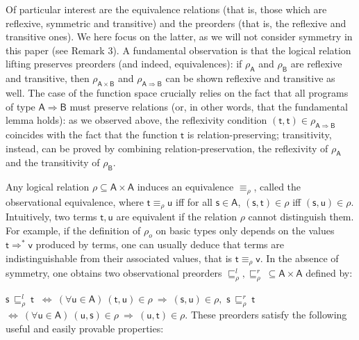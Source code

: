 Of particular interest are the equivalence relations (that is, those which are reflexive, symmetric and transitive) and the preorders (that is, the reflexive and transitive ones). We here focus on the latter, as we will not consider symmetry in this paper (see Remark 3). A fundamental observation is that the logical relation lifting preserves preorders (and indeed, equivalences): if $\rho_{\mathsf{A}}$ and $\rho_{\mathsf{B}}$ are reflexive and transitive, then $\rho_{\mathsf{A}\times\mathsf{B}}$ and $\rho_{\mathsf{A}\Rightarrow\mathsf{B}}$ can be shown reflexive and transitive as well. The case of the function space crucially relies on the fact that all programs of type $\mathsf{A}\Rightarrow\mathsf{B}$ must preserve relations (or, in other words, that the fundamental lemma holds): as we observed above, the reflexivity condition $(\mathsf{t},\mathsf{t})\in\rho_{\mathsf{A}\Rightarrow\mathsf{B}}$ coincides with the fact that the function $\mathsf{t}$ is relation-preserving; transitivity, instead, can be proved by combining relation-preservation, the reflexivity of $\rho_{\mathsf{A}}$ and the transitivity of $\rho_{\mathsf{B}}$.\par
 
 
 
Any logical relation $\rho\subseteq\mathsf{A}\times\mathsf{A}$ induces an equivalence $\equiv_{\rho}$, called the observational equivalence, where $\mathsf{t}\equiv_{\rho}\mathsf{u}$ iff for all $\mathsf{s}\in\mathsf{A}$, $(\mathsf{s},\mathsf{t})\in\rho$ iff $(\mathsf{s},\mathsf{u})\in\rho$. Intuitively, two terms $\mathsf{t},\mathsf{u}$ are equivalent if the relation $\rho$ cannot distinguish them. For example, if the definition of $\rho_{o}$ on basic types only depends on the values $\mathsf{t}\Rightarrow^{*}\mathsf{v}$ produced by terms, one can usually deduce that terms are indistinguishable from their associated values, that is $\mathsf{t}\equiv_{\rho}\mathsf{v}$. In the absence of symmetry, one obtains two observational preorders $\sqsubseteq^{l}_{\rho},\sqsubseteq^{r}_{\rho}\ \subseteq\mathsf{A}\times%
\mathsf{A}$ defined by:\par
    $\displaystyle\mathsf{s}\ \sqsubseteq^{l}_{\rho}\ \mathsf{t}\ $ $\displaystyle\iff\ (\forall\mathsf{u}\in\mathsf{A})\ (\mathsf{t},\mathsf{u})%
\in\rho\ \Rightarrow\ (\mathsf{s},\mathsf{u})\in\rho,$     $\displaystyle\mathsf{s}\ \sqsubseteq^{r}_{\rho}\ \mathsf{t}\ $ $\displaystyle\iff\ (\forall\mathsf{u}\in\mathsf{A})\ (\mathsf{u},\mathsf{s})%
\in\rho\ \Rightarrow\ (\mathsf{u},\mathsf{t})\in\rho.$    
These preorders satisfy the following useful and easily provable properties:\par
 
